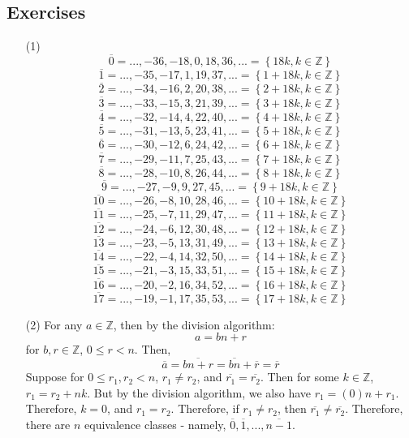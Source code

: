 \documentclass[12pt]{article}
\begin{document}
\subsection*{Exercises}
\begin{itemize}
\item[(1)]
$$\overline{0} = ..., -36, -18, 0, 18, 36, ... = \left\lbrace 18k, k \in \mathbb{Z}\right\rbrace$$
$$\overline{1} = ..., -35, -17, 1, 19, 37, ... = \left\lbrace 1 + 18k, k \in \mathbb{Z}\right\rbrace$$
$$\overline{2} = ..., -34, -16, 2, 20, 38, ... = \left\lbrace 2 + 18k, k \in \mathbb{Z}\right\rbrace$$
$$\overline{3} = ..., -33, -15, 3, 21, 39, ... = \left\lbrace 3 + 18k, k \in \mathbb{Z}\right\rbrace$$
$$\overline{4} = ..., -32, -14, 4, 22, 40, ... = \left\lbrace 4 + 18k, k \in \mathbb{Z}\right\rbrace$$
$$\overline{5} = ..., -31, -13, 5, 23, 41, ... = \left\lbrace 5 + 18k, k \in \mathbb{Z}\right\rbrace$$
$$\overline{6} = ..., -30, -12, 6, 24, 42, ... = \left\lbrace 6 + 18k, k \in \mathbb{Z}\right\rbrace$$
$$\overline{7} = ..., -29, -11, 7, 25, 43, ... = \left\lbrace 7 + 18k, k \in \mathbb{Z}\right\rbrace$$
$$\overline{8} = ..., -28, -10, 8, 26, 44, ... = \left\lbrace 8 + 18k, k \in \mathbb{Z}\right\rbrace$$
$$\overline{9} = ..., -27, -9, 9, 27, 45, ... = \left\lbrace 9 + 18k, k \in \mathbb{Z}\right\rbrace$$
$$\overline{10} = ..., -26, -8, 10, 28, 46, ... = \left\lbrace 10 + 18k, k \in \mathbb{Z}\right\rbrace$$
$$\overline{11} = ..., -25, -7, 11, 29, 47, ... = \left\lbrace 11 + 18k, k \in \mathbb{Z}\right\rbrace$$
$$\overline{12} = ..., -24, -6, 12, 30, 48, ... = \left\lbrace 12 + 18k, k \in \mathbb{Z}\right\rbrace$$
$$\overline{13} = ..., -23, -5, 13, 31, 49, ... = \left\lbrace 13 + 18k, k \in \mathbb{Z}\right\rbrace$$
$$\overline{14} = ..., -22, -4, 14, 32, 50, ... = \left\lbrace 14 + 18k, k \in \mathbb{Z}\right\rbrace$$
$$\overline{15} = ..., -21, -3, 15, 33, 51, ... = \left\lbrace 15 + 18k, k \in \mathbb{Z}\right\rbrace$$
$$\overline{16} = ..., -20, -2, 16, 34, 52, ... = \left\lbrace 16 + 18k, k \in \mathbb{Z}\right\rbrace$$
$$\overline{17} = ..., -19, -1, 17, 35, 53, ... = \left\lbrace 17 + 18k, k \in \mathbb{Z}\right\rbrace$$
\item[(2)] For any $a \in \mathbb{Z}$, then by the division algorithm:
$$a = bn + r$$
for $b, r \in \mathbb{Z}$, $0 \leq r < n$. Then,
$$\overline{a} = \overline{bn + r} = \overline{bn} + \overline{r} = \overline{r}$$
Suppose for $0 \leq r_1, r_2 < n$, $r_1 \neq r_2$, and $\overline{r_1} = \overline{r_2}$. Then for some $k \in \mathbb{Z}$, $r_1 = r_2 + nk$. But by the division algorithm, we also have $r_1 = (0)n + r_1$. Therefore, $k = 0$, and $r_1 = r_2$. Therefore, if $r_1 \neq r_2$, then $\overline{r_1} \neq \overline{r_2}$. Therefore, there are $n$ equivalence classes - namely, $\overline{0}, \overline{1}, ..., \overline{n-1}$.

\end{itemize}
\end{document}
